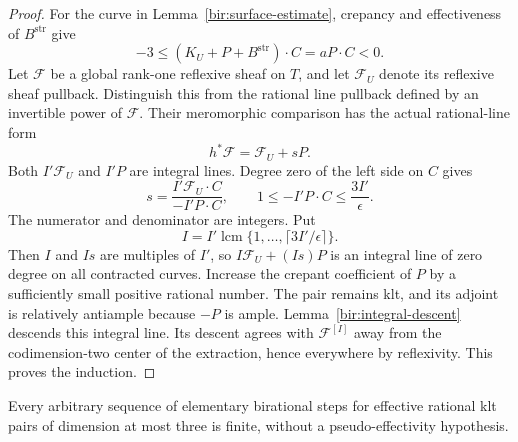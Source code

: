 \begin{proof}
For the curve in Lemma~\ref{bir:surface-estimate}, crepancy and
effectiveness of $B^{\mathrm{str}}$ give
\begin{equation}
 -3\leq (K_U+P+B^{\mathrm{str}})\cdot C
       =aP\cdot C<0.
 \label{bir:index-degree}
\end{equation}
Let $\mathcal F$ be a global rank-one reflexive sheaf on $T$, and
let $\mathcal F_U$ denote its reflexive sheaf pullback.  Distinguish
this from the rational line pullback defined by an invertible power
of $\mathcal F$.  Their meromorphic comparison has the actual
rational-line form
\begin{equation}
 h^*\mathcal F=\mathcal F_U+sP.
 \label{bir:index-correction}
\end{equation}
Both $I'\mathcal F_U$ and $I'P$ are integral lines.  Degree zero of
the left side on $C$ gives
\begin{equation}
 s=\frac{I'\mathcal F_U\cdot C}{-I'P\cdot C},
 \qquad 1\leq -I'P\cdot C\leq\frac{3I'}{\epsilon}.
 \label{bir:index-denominator}
\end{equation}
The numerator and denominator are integers.  Put
\begin{equation}
 I=I'\operatorname{lcm}
       \{1,\ldots,\lceil3I'/\epsilon\rceil\}.
 \label{bir:index-recursion}
\end{equation}
Then $I$ and $Is$ are multiples of $I'$, so
$I\mathcal F_U+(Is)P$ is an integral line of zero degree on all
contracted curves.  Increase the crepant coefficient of $P$ by a
sufficiently small positive rational number.  The pair remains klt,
and its adjoint is relatively antiample because $-P$ is ample.
Lemma~\ref{bir:integral-descent} descends this integral line.  Its
descent agrees with $\mathcal F^{[I]}$ away from the codimension-two
center of the extraction, hence everywhere by reflexivity.  This
proves the induction.
\end{proof}

\begin{theorem}
\label{bir:klt-termination}
Every arbitrary sequence of elementary birational steps for effective
rational klt pairs of dimension at most three is finite, without a
pseudo-effectivity hypothesis.
\end{theorem}

